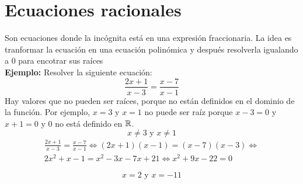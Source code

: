 \section{Ecuaciones racionales}
Son ecuaciones donde la incógnita está en una expresión fraccionaria. La idea es tranformar la ecuación en una ecuación polinómica y después resolverla igualando a 0 para encotrar sus raíces \vspace{1em}\\ 
\textbf{Ejemplo:} Resolver la siguiente ecuación:
$$\frac{2x+1}{x-3} = \frac{x-7}{x-1}$$
Hay valores que no pueden ser raíces, porque no están definidos en el dominio de la función. Por ejemplo, $x = 3$ y $x=1$ no puede ser raíz porque $x-3 = 0$ y $x+1 = 0$ y $0$ no está definido en ${\mathbb{R}}$.\\
$$x \neq 3 \text{ y } x \neq 1$$
\begin{gather*}
{\frac{2x+1}{x-3} = \frac{x-7}{x-1} \Leftrightarrow (2x+1)(x-1) = (x-7)(x-3) \Leftrightarrow} \\
{2x^2 + x - 1 = x^2 - 3x - 7x + 21 \Leftrightarrow x^2 + 9x - 22 = 0}
\end{gather*}
\begin{center}
    $$\boxed{x = 2 \text{ y } x = -11}$$
\end{center}
